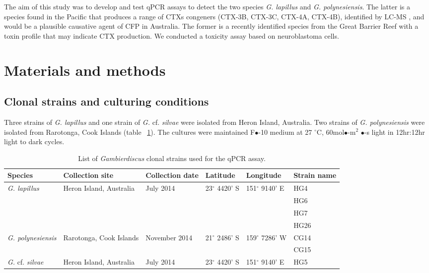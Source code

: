 \documentclass[12pt]{article}
\begin{document}
The aim of this study was to develop and test qPCR assays to detect the two species \emph{G. lapillus} and \emph{G. polynesiensis}. The latter is a species found in the Pacific that produces a range of CTXs congeners (CTX-3B, CTX-3C, CTX-4A, CTX-4B), identified by LC-MS \cite{rhodes2014production}, and would be a plausible causative agent of CFP in Australia. The former is a recently identified species from the Great Barrier Reef with a toxin profile that may indicate CTX production. We conducted a toxicity assay based on neuroblastoma cells.
\newpage
\section*{Materials and methods}
\subsection*{Clonal strains and culturing conditions}
Three strains of \emph{G. lapillus} and one strain of \emph{G.} cf. \emph{silvae} were isolated from Heron Island, Australia. Two strains of \emph{G. polynesiensis} were isolated from Rarotonga, Cook Islands (table ~\ref{tbl:StrainTable}). The cultures were maintained F$\bullet$-10 medium at 27 $^{\circ}$C, 60mol$\bullet$-m$^{2}$ $\bullet$-s light in 12hr:12hr light to dark cycles.
\FloatBarrier
\begin{table}
\caption{List of \emph{Gambierdiscus} clonal strains used for the qPCR assay.}
\label{tbl:StrainTable}
\begin{tabular}{ | p{2cm} | p{2cm} | p{2cm}| p{3cm} | p{3cm} | p{2cm} | }
\hline
\textbf{Species} & \textbf{Collection site} & \textbf{Collection date} &\textbf{Latitude} & \textbf{Longitude} & \textbf{Strain name} \\
\hline
\emph{G. lapillus} &Heron Island, Australia &July 2014 &23$^{\circ}$ 4420' S&151$^{\circ}$ 9140' E & HG4 \\
\hline
&&&&& HG6\\
\hline
&&&& &HG7\\
\hline
&&&& &HG26\\
\hline
\emph{G. polynesiensis}&Rarotonga, Cook Islands&November 2014 &21$^{\circ}$ 2486' S&159$^{\circ}$ 7286' W & CG14 \\
\hline
&&&&&CG15\\
\hline
\emph{G.} cf. \emph{silvae}&Heron Island, Australia &July 2014 &23$^{\circ}$ 4420' S&151$^{\circ}$ 9140' E& HG5\\
\hline
\end{tabular}
\end{table}
\end{document}

